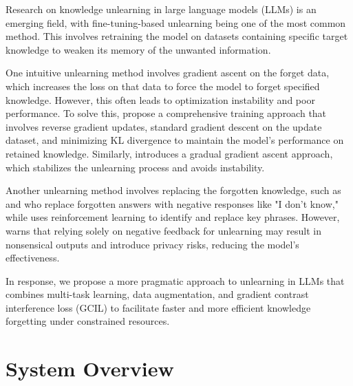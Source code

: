 \documentclass[11pt]{article}
\begin{document}
Research on knowledge unlearning in large language models (LLMs) is an emerging field, with fine-tuning-based unlearning being one of the most common method. This involves retraining the model on datasets containing specific target knowledge to weaken its memory of the unwanted information.

One intuitive unlearning method involves gradient ascent on the forget data, which increases the loss on that data to force the model to forget specified knowledge. However, this often leads to optimization instability and poor performance. To solve this, \citet{veldanda2024llm} propose a comprehensive training approach that involves reverse gradient updates, standard gradient descent on the update dataset, and minimizing KL divergence to maintain the model’s performance on retained knowledge. Similarly, \citet{jang2022knowledge} introduces a gradual gradient ascent approach, which stabilizes the unlearning process and avoids instability. 

Another unlearning method involves replacing the forgotten knowledge, such as \citet{choi2024snap} and \citet{shi2024ulmr} who replace forgotten answers with negative responses like "I don't know," while \citet{eldan2023s} uses reinforcement learning to identify and replace key phrases. However, \citet{mekala2024alternate} warns that relying solely on negative feedback for unlearning may result in nonsensical outputs and introduce privacy risks, reducing the model's effectiveness.

In response, we propose a more pragmatic approach to unlearning in LLMs that combines multi-task learning, data augmentation, and gradient contrast interference loss (GCIL) to facilitate faster and more efficient knowledge forgetting under constrained resources.



\section{System Overview}
\end{document}
